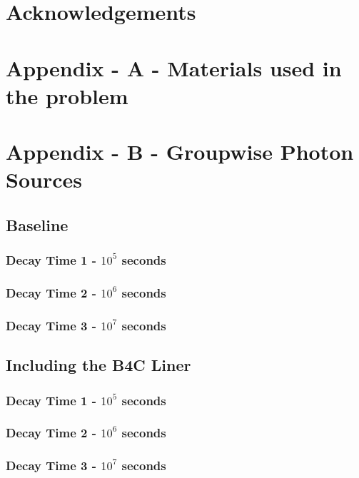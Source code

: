 \documentclass[12pt]{article}
\begin{document}
\section{Acknowledgements}
\newpage
\clearpage


\newpage
\clearpage
\section{Appendix - A - Materials used in the problem}


\section{Appendix - B - Groupwise Photon Sources}
\subsection{Baseline}
\label{appendix:grp_photon_src_baseline}
\subsubsection{Decay Time 1 - $10^{5}$ seconds}

\subsubsection{Decay Time 2 - $10^{6}$ seconds}

\subsubsection{Decay Time 3 - $10^{7}$ seconds}

\subsection{Including the B4C Liner}
\label{appendix:grp_photon_src_b4c}
\subsubsection{Decay Time 1 - $10^{5}$ seconds}

\subsubsection{Decay Time 2 - $10^{6}$ seconds}

\subsubsection{Decay Time 3 - $10^{7}$ seconds}

\end{document}
